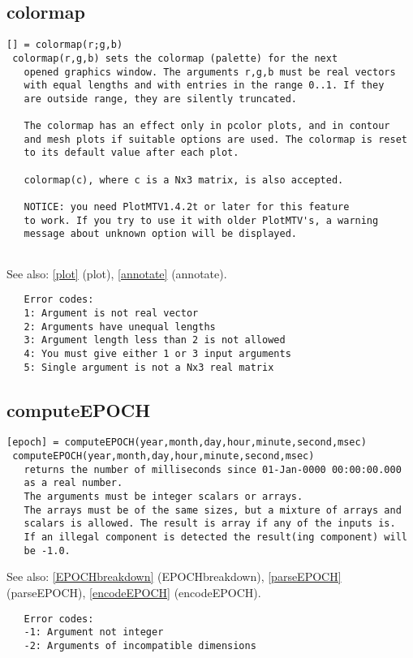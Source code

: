 \documentclass[a4paper]{article}
\begin{document}
\subsection{colormap\label{colormap}}

\begin{tscreen}
\begin{verbatim}
[] = colormap(r;g,b)
 colormap(r,g,b) sets the colormap (palette) for the next
   opened graphics window. The arguments r,g,b must be real vectors
   with equal lengths and with entries in the range 0..1. If they
   are outside range, they are silently truncated.

   The colormap has an effect only in pcolor plots, and in contour
   and mesh plots if suitable options are used. The colormap is reset
   to its default value after each plot.

   colormap(c), where c is a Nx3 matrix, is also accepted.
   
   NOTICE: you need PlotMTV1.4.2t or later for this feature
   to work. If you try to use it with older PlotMTV's, a warning
   message about unknown option will be displayed.
   
\end{verbatim}

See also: \ref{plot} {(plot)}, \ref{annotate} {(annotate)}.
\begin{verbatim}
   Error codes:
   1: Argument is not real vector
   2: Arguments have unequal lengths
   3: Argument length less than 2 is not allowed
   4: You must give either 1 or 3 input arguments
   5: Single argument is not a Nx3 real matrix
\end{verbatim}
\end{tscreen}





\subsection{computeEPOCH\label{computeEPOCH}}

\begin{tscreen}
\begin{verbatim}
[epoch] = computeEPOCH(year,month,day,hour,minute,second,msec)
 computeEPOCH(year,month,day,hour,minute,second,msec)
   returns the number of milliseconds since 01-Jan-0000 00:00:00.000
   as a real number.
   The arguments must be integer scalars or arrays.
   The arrays must be of the same sizes, but a mixture of arrays and
   scalars is allowed. The result is array if any of the inputs is.
   If an illegal component is detected the result(ing component) will
   be -1.0.
\end{verbatim}

See also: \ref{EPOCHbreakdown} {(EPOCHbreakdown)}, \ref{parseEPOCH} {(parseEPOCH)}, \ref{encodeEPOCH} {(encodeEPOCH)}.
\begin{verbatim}
   Error codes:
   -1: Argument not integer
   -2: Arguments of incompatible dimensions
\end{verbatim}
\end{tscreen}
\end{document}
